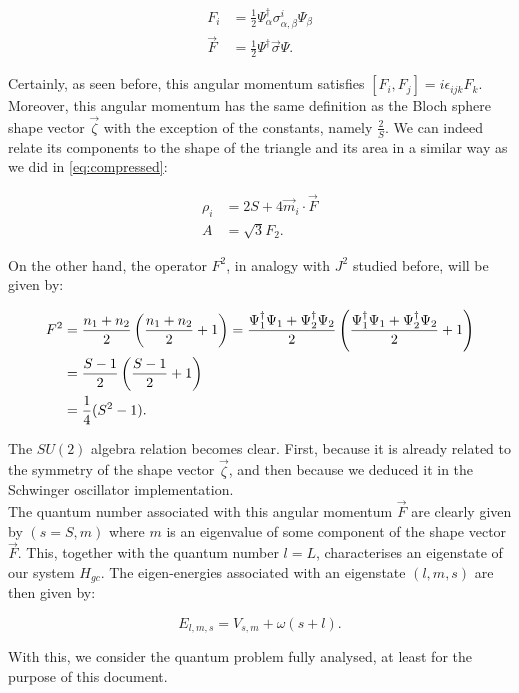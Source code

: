 \begin{align*}
F_i  &= \frac{1}{2}\Psi_\alpha^\dagger \sigma^i_{\alpha,\beta}\Psi_\beta\\
\vec{F} &= \frac{1}{2}\Psi^\dagger \vec{\sigma}\Psi.
\end{align*}

Certainly, as seen before, this angular momentum satisfies $[F_i,F_j] = i\epsilon_{ijk}F_k$. Moreover, this angular momentum has the same definition as the Bloch sphere shape vector $\vec{\zeta}$ with the exception of the constants, namely $\frac{2}{S}$. We can indeed relate its components to the shape of the triangle and its area in a similar way as we did in \eqref{eq:compressed}:

\begin{align*}
\rho_i &= 2S+4\vec{m}_i\cdot\vec{F}\\
A &= \sqrt{3}F_2.
\end{align*}

On the other hand, the operator $F^2$, in analogy with $J^2$ studied before, will be given by: 

\begin{align*}
F^2 &= \frac{n_1+n_2}{2}\left( \frac{n_1+n_2}{2}+1 \right) = \frac{\Psi_1^\dagger \Psi_1 + \Psi_2^\dagger \Psi_2}{2}\left( \frac{\Psi_1^\dagger \Psi_1 + \Psi_2^\dagger \Psi_2}{2}+1 \right)\\
&= \frac{S-1}{2}\left( \frac{S-1}{2}+1 \right)\\
&= \frac{1}{4}(S^2-1).
\end{align*}

The $SU(2)$ algebra relation becomes clear. First, because it is already related to the symmetry of the shape vector $\vec{\zeta}$, and then because we deduced it in the Schwinger oscillator implementation.\\

The quantum number associated with this angular momentum $\vec{F}$ are clearly given by $(s= S,m)$ where $m$ is an eigenvalue of some component of the shape vector $\vec{F}$. This, together with the quantum number $l=L$, characterises an eigenstate of our system $H_{gc}$. The eigen-energies associated with an eigenstate $(l,m,s)$ are then given by:

\begin{equation*}
E_{l,m,s} = V_{s,m} + \omega(s+l).
\end{equation*}

With this, we consider the quantum problem fully analysed, at least for the purpose of this document.
















